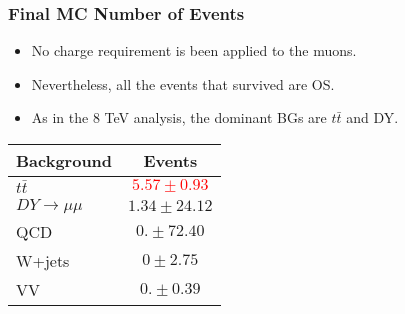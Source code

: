 \documentclass{beamer}
\begin{document}
 
 \begin{frame}
   
   \frametitle{Final MC Number of Events}
 
 \begin{itemize}
   \item No charge requirement is been applied to the muons.
   \item Nevertheless, all the events that survived are OS.
   \item As in the 8 TeV analysis, the dominant BGs are $t\bar{t}$ and DY.
 \end{itemize}
   
   
\begin{table}[htbp]
\tiny{
\begin{center}
\begin{tabular}{lc}\hline\hline

Background & Events \\

 \hline 

  $t\bar{t}$ & \textcolor{red}{$5.57 \pm  0.93$}\\
  $DY \rightarrow \mu \mu$ & $1.34 \pm  24.12$ \\
  QCD    & $0. \pm  72.40$ \\
  W+jets & $0 \pm 2.75$ \\
  VV       & $0. \pm 0.39$  \\
 \hline 
 
 \end{tabular}
\end{center}
}
\end{table}

 \end{frame}
\end{document}
